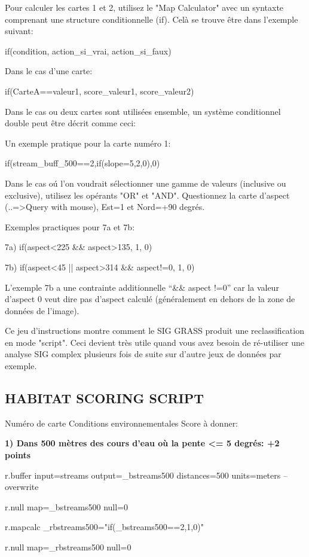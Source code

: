 Pour calculer les cartes 1 et 2, utilisez le "Map Calculator" avec un syntaxte comprenant une structure conditionnelle (if). Cel\`a se trouve \^etre dans l'exemple suivant:
\begin{smallverbatim}
if(condition, action_si_vrai, action_si_faux)
\end{smallverbatim}
Dans le cas d'une carte:
\begin{smallverbatim}
if(CarteA==valeur1, score_valeur1, score_valeur2)
\end{smallverbatim}
Dans le cas ou deux cartes sont utilis\'ees ensemble, un syst\`eme conditionnel double peut \^etre d\'ecrit comme ceci:

Un exemple pratique pour la carte num\'ero 1:
\begin{smallverbatim}
if(stream_buff_500==2,if(slope=5,2,0),0)
\end{smallverbatim}
Dans le cas o\'u l'on voudrait s\'electionner une gamme de valeurs (inclusive ou exclusive), utilisez les op\'erants "OR" et "AND". Questionnez la carte d'aspect (..=>Query with mouse), Est=1 et Nord=+90 degr\'es.

Exemples practiques pour 7a et 7b:
\begin{smallverbatim}
7a) if(aspect<225 && aspect>135, 1, 0)

7b) if(aspect<45 || aspect>314 && aspect!=0, 1, 0)
\end{smallverbatim}
L'exemple 7b a une contrainte additionnelle ``\&\& aspect !=0'' car la valeur d'aspect 0 veut dire pas d'aspect calcul\'e (g\'en\'eralement en dehors de la zone de donn\'ees de l'image).

Ce jeu d'instructions montre comment le SIG GRASS produit une reclassification en mode "script". Ceci devient tr\`es utile quand vous avez besoin de r\'e-utiliser une analyse SIG complex plusieurs fois de suite sur d'autre jeux de donn\'ees par exemple.

\subsection{HABITAT SCORING SCRIPT}

Num\'ero de carte Conditions environnementales Score \`a donner:

\textbf{
1) Dans 500 m\`etres des cours d'eau o\`u la pente <= 5 degr\'es: +2 points}
\begin{smallverbatim}
r.buffer input=streams output=_bstreams500
 distances=500 units=meters --overwrite

r.null map=_bstreams500 null=0

r.mapcalc _rbstreams500="if(_bstreams500==2,1,0)"

r.null map=_rbstreams500 null=0
\end{smallverbatim}

